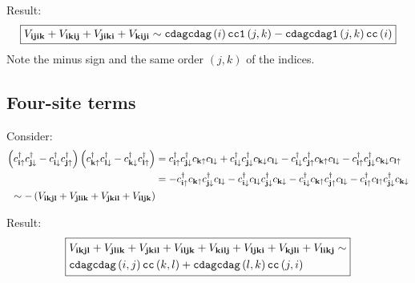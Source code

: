 \documentclass[12pt,paper=a4,BCOR=16mm]{article}
\newcommand{\cUP}[1]{c_{#1\uparrow}}
\newcommand{\cdagUP}[1]{c^{\dagger}_{#1\uparrow}}
\newcommand{\cDN}[1]{c_{#1\downarrow}}
\newcommand{\cdagDN}[1]{c^{\dagger}_{#1\downarrow}}
\begin{document}
Result:
\begin{equation}
\boxed{ 
V_{\mathbf{ijik}} + V_{\mathbf{ikij}} + V_{\mathbf{jiki}} + V_{\mathbf{kiji}} \sim \mathtt{cdagcdag}\left(i\right) \mathtt{cc1}\left(j,k\right) - \mathtt{cdagcdag1}\left(j,k\right) \mathtt{cc}\left(i\right)
}
\end{equation}
Note the minus sign and the same order $(j,k)$ of the indices.

\subsection{Four-site terms}

Consider:
\begin{equation}
\begin{split}
\lr{ \cdagUP{\v{i}}\cdagDN{\v{j}} - \cdagDN{\v{i}}\cdagUP{\v{j}} } \lr{ \cdagUP{\v{k}}\cdagDN{\v{l}} - \cdagDN{\v{k}}\cdagUP{\v{l}} }
&=
 \cdagUP{\v{i}} \cdagDN{\v{j}} \cUP{\v{k}} \cDN{\v{l}}
+\cdagDN{\v{i}} \cdagDN{\v{j}} \cDN{\v{k}} \cDN{\v{l}}
-\cdagDN{\v{i}} \cdagUP{\v{j}} \cUP{\v{k}} \cDN{\v{l}}
-\cdagUP{\v{i}} \cdagDN{\v{j}} \cDN{\v{k}} \cUP{\v{l}}\\
&= 
-\cdagUP{\v{i}} \cUP{\v{k}} \cdagDN{\v{j}} \cDN{\v{l}}
-\cdagDN{\v{i}} \cDN{\v{l}} \cdagDN{\v{j}} \cDN{\v{k}} 
-\cdagDN{\v{i}} \cUP{\v{k}} \cdagUP{\v{j}} \cDN{\v{l}}
-\cdagUP{\v{i}} \cUP{\v{l}} \cdagDN{\v{j}} \cDN{\v{k}}\\
\sim -\lr{ V_{\v{ikjl}} + V_{\v{jlik}} + V_{\v{jkil}} + V_{\v{iljk}} }
\end{split}
\end{equation}

Result:
\begin{equation}
\boxed{
\begin{split} 
 &V_{\mathbf{ikjl}} + V_{\mathbf{jlik}} + V_{\mathbf{jkil}} + V_{\mathbf{iljk}}+V_{\mathbf{kilj}} + V_{\mathbf{ljki}} + V_{\mathbf{kjli}} + V_{\mathbf{likj}}
\sim \\
&\mathtt{cdagcdag}\left(i,j\right) \mathtt{cc}\left(k,l\right) + \mathtt{cdagcdag}\left(l,k\right) \mathtt{cc}\left(j,i\right)
\end{split}
}
\end{equation}
\end{document}
